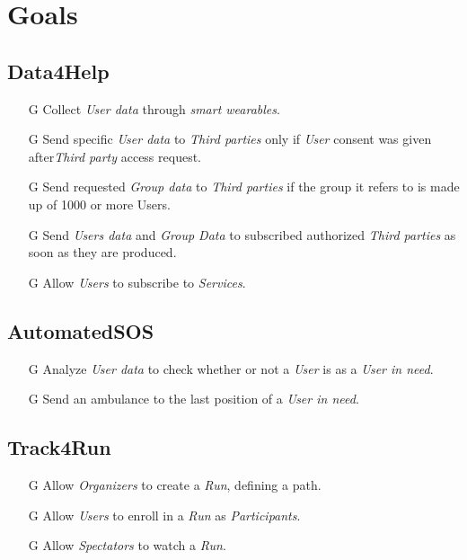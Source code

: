 \documentclass[../../rasd.tex]{subfiles}
\begin{document}
\section{Goals}

				\subsection{Data4Help}
					\begin{itemize}
						
						\item[G\subs{1}]Collect \textit{User data} through \textit{smart wearables}.
						
						\item[G\subs{2}]Send specific \textit{User data} to \textit{Third parties} only if \textit{User} consent was given after\textit{Third party} access request.
						\item[G\subs{3}]Send requested \textit{Group data} to \textit{Third parties} if the group it refers to is made up of 1000 or more Users.

						\item[G\subs{4}]Send \textit{Users data} and \textit{Group Data} to subscribed authorized \textit{Third parties} as soon as they are produced.
						
						\item[G\subs{5}]Allow \textit{Users} to subscribe to \textit{Services}.		
						
					\end{itemize}

				\subsection{AutomatedSOS}
					\begin{itemize}
						\item[G\subs{7}]Analyze \textit{User data} to check whether or not a \textit{User} is as a \textit{User in need}.
						\item[G\subs{8}]Send an ambulance to the last position of a \textit{User in need}.
					\end{itemize}

				\subsection{Track4Run}
					\begin{itemize}
						\item[G\subs{9}]Allow \textit{Organizers} to create a \textit{Run}, defining a path.
						\item[G\subs{10}]Allow \textit{Users} to enroll in a \textit{Run} as \textit{Participants}. 
						\item[G\subs{11}]Allow \textit{Spectators} to watch a \textit{Run}.
					\end{itemize}
\end{document}

